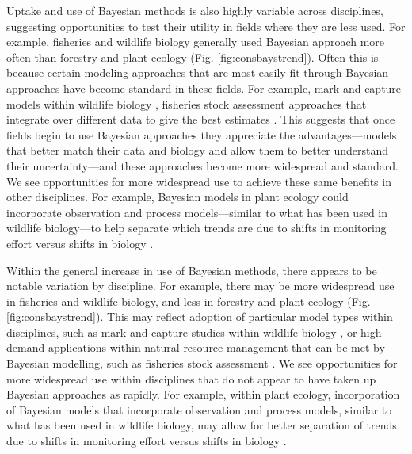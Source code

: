 \documentclass{article}
\begin{document}
\par Uptake and use of Bayesian methods is also highly variable across disciplines, suggesting opportunities to test their utility in fields where they are less used. For example, fisheries and wildlife biology generally used Bayesian approach more often than forestry and plant ecology (Fig. \ref{fig:consbaystrend}). Often this is because certain modeling approaches that are most easily fit through Bayesian approaches have become standard in these fields. For example, mark-and-capture models within wildlife biology \citep[e.g.,][]{royle2013spatial,calvert2009hierarchical},  fisheries stock assessment approaches that integrate over different data to give the best estimates \citep[e.g.,][]{punt1997fisheries}. This suggests that once fields begin to use Bayesian approaches they appreciate the advantages---models that better match their data and biology and allow them to better understand their uncertainty---and these approaches become more widespread and standard. We see opportunities for more widespread use to achieve these same benefits in other disciplines. For example, Bayesian models in plant ecology could incorporate observation and process models---similar to what has been used in wildlife biology---to help separate which trends are due to shifts in monitoring effort versus shifts in biology \citep[][]{pearse2017statistical}.


\par Within the general increase in use of Bayesian methods, there appears to be notable variation by discipline. For example, there may be more widespread use in fisheries and wildlife biology, and less in forestry and plant ecology (Fig. \ref{fig:consbaystrend}). This may reflect adoption of particular model types within disciplines, such as mark-and-capture studies within wildlife biology \citep[e.g.,][]{royle2013spatial,calvert2009hierarchical}, or high-demand applications within natural resource management that can be met by Bayesian modelling, such as fisheries stock assessment \citep[e.g.,][]{punt1997fisheries}. We see opportunities for more widespread use within disciplines that do not appear to have  taken up Bayesian approaches as rapidly. For example, within plant ecology, incorporation of Bayesian models that incorporate observation and process models, similar to what has been used in wildlife biology, may allow for better separation of trends due to shifts in monitoring effort versus shifts in biology \citep[][]{pearse2017statistical}.
\end{document}
